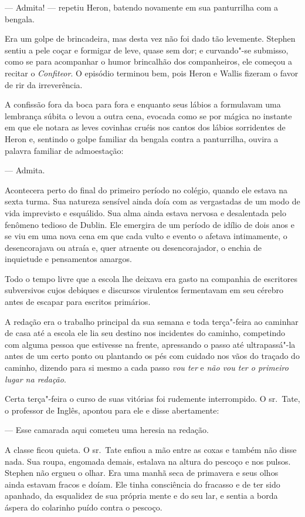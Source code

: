  --- Admita! --- repetiu Heron, batendo novamente em sua panturrilha com a
bengala.

Era um golpe de brincadeira, mas desta vez não foi dado tão levemente.
Stephen sentiu a pele coçar e formigar de leve, quase sem dor; e
curvando"-se submisso, como se para acompanhar o humor brincalhão dos
companheiros, ele começou a recitar o \textit{Confiteor}. O episódio
terminou bem, pois Heron e Wallis fizeram o favor de rir da
irreverência.

A confissão fora da boca para fora e enquanto seus lábios a formulavam
uma lembrança súbita o levou a outra cena, evocada como se por mágica
no instante em que ele notara as leves covinhas cruéis nos cantos dos
lábios sorridentes de Heron e, sentindo o golpe familiar da bengala
contra a panturrilha, ouvira a palavra familiar de admoestação:

 --- Admita.

Acontecera perto do final do primeiro período no colégio, quando ele
estava na sexta turma. Sua natureza sensível ainda doía com as
vergastadas de um modo de vida imprevisto e esquálido. Sua alma
ainda estava nervosa e desalentada pelo fenômeno tedioso de Dublin. Ele
emergira de um período de idílio de dois anos e se viu em uma nova cena
em que cada vulto e evento o afetava intimamente, o desencorajava ou
atraía e, quer atraente ou desencorajador, o enchia de inquietude e
pensamentos amargos.

Todo o tempo livre que a escola lhe deixava era gasto na companhia de
escritores subversivos cujos debiques e discursos virulentos
fermentavam em seu cérebro antes de escapar para escritos primários.

A redação era o trabalho principal da sua semana e toda terça"-feira ao
caminhar de casa até a escola ele lia seu destino nos incidentes do
caminho, competindo com alguma pessoa que estivesse na frente,
apressando o passo até ultrapassá"-la antes de um certo ponto ou
plantando os pés com cuidado nos vãos do traçado do caminho, dizendo
para si mesmo a cada passo \textit{vou ter} e \textit{não vou ter o
primeiro lugar na redação}.

Certa terça"-feira o curso de suas vitórias foi rudemente interrompido. O
sr.~Tate, o professor de Inglês, apontou para ele e disse abertamente:

 --- Esse camarada aqui cometeu uma heresia na redação.

A classe ficou quieta. O sr.~Tate enfiou a mão entre as coxas e também
não disse nada. Sua roupa, engomada demais, estalava na altura do
pescoço e nos pulsos. Stephen não ergueu o olhar. Era uma manhã seca de
primavera e seus olhos ainda estavam fracos e doíam. Ele tinha
consciência do fracasso e de ter sido apanhado, da esqualidez de sua
própria mente e do seu lar, e sentia a borda áspera do colarinho puído
contra o pescoço.

